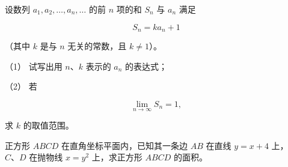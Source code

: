 \begin{question}
设数列 $a_1,a_2,\ldots,a_n,\ldots$ 的前 $n$ 项的和 $S_n$ 与 $a_n$ 满足

\nopagebreak[4]
\[
S_n=ka_n+1
\]

（其中 $k$ 是与 $n$ 无关的常数，且 $k\ne1$）。

（1） 试写出用 $n\text{、}k$ 表示的 $a_n$ 的表达式；

（2） 若

\nopagebreak[4]
\[
\lim_{n\to\infty}S_n=1,
\]

求 $k$ 的取值范围。

\end{question}
\begin{question}
正方形 $ABCD$ 在直角坐标平面内，已知其一条边 $AB$ 在直线 $y=x+4$ 上，$C\text{、}D$ 在抛物线 $x=y^2$ 上，求正方形 $ABCD$ 的面积。

\end{question}